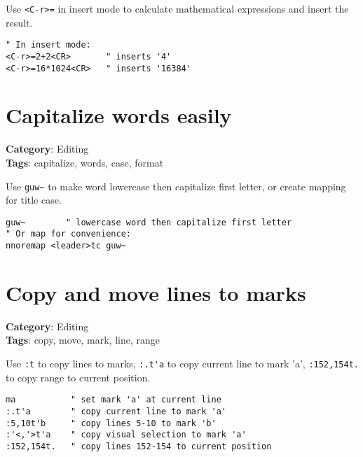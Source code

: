 {{{Use {\footnotesize \Verb§<C-r>=§} in insert mode to calculate mathematical expressions and insert the result.

\begin{Exa*}{}
\begin{Verbatim}[fontsize=\footnotesize, breaklines, breakanywhere]
" In insert mode:
<C-r>=2+2<CR>       " inserts '4'
<C-r>=16*1024<CR>   " inserts '16384'
\end{Verbatim}
\end{Exa*}

\section{Capitalize words easily}

\textbf{Category}: Editing\\ \textbf{Tags}: capitalize, words, case, format
\vspace{0.5cm}

Use {\footnotesize \Verb§guw~§} to make word lowercase then capitalize first letter, or create mapping for title case.

\begin{Exa*}{}
\begin{Verbatim}[fontsize=\footnotesize, breaklines, breakanywhere]
guw~        " lowercase word then capitalize first letter
" Or map for convenience:
nnoremap <leader>tc guw~
\end{Verbatim}
\end{Exa*}

\section{Copy and move lines to marks}

\textbf{Category}: Editing\\ \textbf{Tags}: copy, move, mark, line, range
\vspace{0.5cm}

Use {\footnotesize \Verb§:t§} to copy lines to marks, {\footnotesize \Verb§:.t'a§} to copy current line to mark 'a', {\footnotesize \Verb§:152,154t.§} to copy range to current position.

\begin{Exa*}{}
\begin{Verbatim}[fontsize=\footnotesize, breaklines, breakanywhere]
ma           " set mark 'a' at current line
:.t'a        " copy current line to mark 'a'
:5,10t'b     " copy lines 5-10 to mark 'b'
:'<,'>t'a    " copy visual selection to mark 'a'
:152,154t.   " copy lines 152-154 to current position
\end{Verbatim}
\end{Exa*}

}}}
